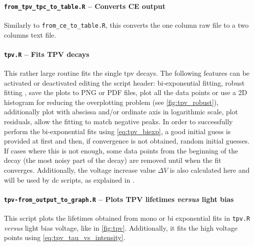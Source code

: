 		\paragraph{\texttt{from\_tpv\_tpc\_to\_table.R} -- Converts CE output}
		Similarly to \texttt{from\_ce\_to\_table.R}, this converts the one column raw file to a two columns text file.

		\paragraph{\texttt{tpv.R} -- Fits TPV decays}
		This rather large routine fits the single \gls{tpv} decays.
		The following features can be activated or deactivated editing the script header:
		bi-exponential fitting, robust fitting \cite{Maechler2018}, save the plots to PNG or PDF files, plot all the data points or use a 2D histogram for reducing the overplotting problem (see \cref{fig:tpv_robust}), additionally plot with abscissa and/or ordinate axis in logarithmic scale, plot residuals, allow the fitting to match negative peaks.
		In order to successfully perform the bi-exponential fits using \cref{eq:tpv_biexp}, a good initial guess is provided at first and then, if convergence is not obtained, random initial guesses.
		If cases where this is not enough, some data points from the beginning of the decay (the most noisy part of the decay) are removed until when the fit converges.
		Additionally, the voltage increase value $\Delta V$ is also calculated here and will be used by \gls{dc} scripts, as explained in .
		
%		
%				
		\paragraph{\texttt{tpv-\-from\_output\_to\_graph.R} -- Plots TPV lifetimes \textsl{versus} light bias}
		This script plots the lifetimes obtained from mono or bi exponential fits in \texttt{tpv.R} \textsl{versus} light bias voltage, like in \cref{fig:tpv}.
		Additionally, it fits the high voltage points using \cref{eq:tpv_tau_vs_intensity}.
%		
%
